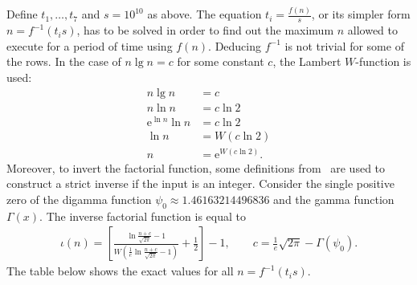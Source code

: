 \documentclass[12pt]{article}
\newcommand{\euler}{\mathrm{e}}
\begin{document}
Define $t_{1}, \dots, t_{7}$ and $s = 10^{10}$ as above. The equation $t_{i} = \frac{f(n)}{s}$, or its simpler form $n = f^{-1}(t_{i} s)$, has to be solved in order to find out the maximum $n$ allowed to execute for a period of time using $f(n)$. Deducing $f^{-1}$ is not trivial for some of the rows. In the case of $n \lg n = c$ for some constant $c$, the Lambert $W$-function is used:
\begin{align*}
    n \lg n &= c \\
    n \ln n &= c \ln 2 \\
    \euler^{\ln n} \ln n &= c \ln 2 \\
    \ln n &= W(c \ln 2) \\
    n &= \euler^{W(c \ln 2)}.
\end{align*}
Moreover, to invert the factorial function, some definitions from~\cite{Cantrell:200110:misc} are used to construct a strict inverse if the input is an integer. Consider the single positive zero of the digamma function $\psi_{0} \approx 1.46163214496836$ and the gamma function $\Gamma(x)$. The inverse factorial function is equal to
\begin{align*}
    \iota(n) = \left[\frac{\ln\frac{n + c}{\sqrt{2 \pi}} - 1}{W(\frac{1}{e}\ln\frac{n + c}{\sqrt{2 \pi}} - 1)} + \frac{1}{2}\right] - 1, \qquad c = \frac{1}{e} \sqrt{2 \pi} - \Gamma(\psi_{0}).
\end{align*}
The table below shows the exact values for all $n = f^{-1}(t_{i} s)$.
\end{document}
